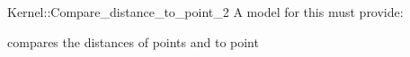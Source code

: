 \begin{ccRefFunctionObjectConcept}{Kernel::Compare_distance_to_point_2}
A model for this must provide:


{}

      {compares the distances of points  and  to point }

\end{ccRefFunctionObjectConcept}
